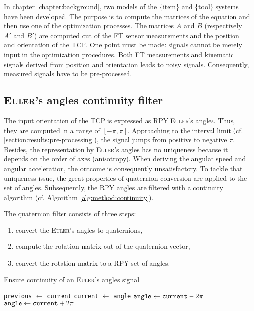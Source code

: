 \documentclass[/home/francois/latex/report/main.tex]{subfiles}
\begin{document}
In chapter \ref{chapter:background}, two models of the \{item\} and \{tool\} systems have been developed. The purpose is to compute the matrices of the equation and then use one of the optimization processes. The matrices $A$ and $B$ (respectively $A'$ and $B'$) are computed out of the \ac{FT} sensor measurements and the position and orientation of the \ac{TCP}. One point must be made: signals cannot be merely input in the optimization procedures. Both \ac{FT} measurements and kinematic signals derived from position and orientation leads to noisy signals. Consequently, measured signals have to be pre-processed.

\subsection{\textsc{Euler}'s angles continuity filter}
\label{subsection:method:euler-filter}

The input orientation of the \ac{TCP} is expressed as \ac{RPY} \textsc{Euler}'s angles. Thus, they are computed in a range of $[-\pi, \pi]$. Approaching to the interval limit (cf. \ref{section:results:pre-processing}), the signal jumps from positive to negative $\pi$. Besides, the representation by \textsc{Euler}'s angles has no uniqueness because it depends on the order of axes (anisotropy). When deriving the angular speed and angular acceleration, the outcome is consequently unsatisfactory. To tackle that uniqueness issue, the great properties of quaternion conversion are applied to the set of angles. Subsequently, the \ac{RPY} angles are filtered with a continuity algorithm (cf. Algorithm \ref{alg:method:continuity}).

The quaternion filter consists of three steps:

\begin{enumerate}
  \item convert the \textsc{Euler}'s angles to quaternions,
  \item compute the rotation matrix out of the quaternion vector,
  \item convert the rotation matrix to a \ac{RPY} set of angles.
\end{enumerate}

\begin{algorithm}
\caption{Ensure continuity of an \textsc{Euler}'s angles signal \label{alg:method:continuity}}
\begin{algorithmic}
  \STATE \texttt{previous}  $\leftarrow$ \texttt{current}
  \STATE \texttt{current}  $\leftarrow$ \texttt{angle}
    \STATE $\text{\texttt{angle}} \leftarrow \text{\texttt{current}} - 2 \pi$
   \ELSE
    \STATE $\text{\texttt{angle}} \leftarrow \text{\texttt{current}} + 2 \pi$
   \ENDIF
  \ENDIF
 \ENDFOR
\ENDFOR
\end{algorithmic}
\end{algorithm}
\end{document}
